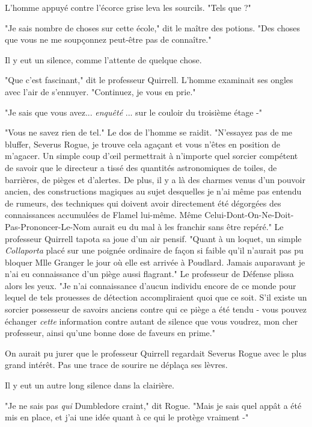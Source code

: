 L'homme appuyé contre l'écorce grise leva les sourcils. "Tels que ?"

"Je sais nombre de choses sur cette école," dit le maître des potions. "Des choses que vous ne me soupçonnez peut-être pas de connaître."

Il y eut un silence, comme l'attente de quelque chose.

"Que c'est fascinant," dit le professeur Quirrell. L'homme examinait ses ongles avec l'air de s'ennuyer. "Continuez, je vous en prie."

"Je sais que vous avez...\emph{ enquêté} ... sur le couloir du troisième étage -"

"Vous ne savez rien de tel." Le dos de l'homme se raidit. "N'essayez pas de me bluffer, Severus Rogue, je trouve cela agaçant et vous n'êtes en position de m'agacer. Un simple coup d'œil permettrait à n'importe quel sorcier compétent de savoir que le directeur a tissé des quantités astronomiques de toiles, de barrières, de pièges et d'alertes. De plus, il y a là des charmes venus d'un pouvoir ancien, des constructions magiques au sujet desquelles je n'ai même pas entendu de rumeurs, des techniques qui doivent avoir directement été dégorgées des connaissances accumulées de Flamel lui-même. Même Celui-Dont-On-Ne-Doit-Pas-Prononcer-Le-Nom aurait eu du mal à les franchir sans être repéré." Le professeur Quirrell tapota sa joue d'un air pensif. "Quant à un loquet, un simple \emph{Collaporta}  placé sur une poignée ordinaire de façon si faible qu'il n'aurait pas pu bloquer Mlle Granger le jour où elle est arrivée à Poudlard. Jamais auparavant je n'ai eu connaissance d'un piège aussi flagrant." Le professeur de Défense plissa alors les yeux. "Je n'ai connaissance d'aucun individu encore de ce monde pour lequel de tels prouesses de détection accompliraient quoi que ce soit. S'il existe un sorcier possesseur de savoirs anciens contre qui ce piège a été tendu - vous pouvez échanger \emph{cette}  information contre autant de silence que vous voudrez, mon cher professeur, ainsi qu'une bonne dose de faveurs en prime."

On aurait pu jurer que le professeur Quirrell regardait Severus Rogue avec le plus grand intérêt. Pas une trace de sourire ne déplaça ses lèvres.

Il y eut un autre long silence dans la clairière.

"Je ne sais pas \emph{qui}  Dumbledore craint," dit Rogue. "Mais je sais quel appât a été mis en place, et j'ai une idée quant à ce qui le protège vraiment -"

